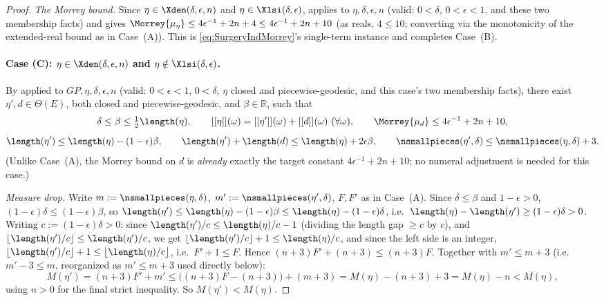 \begin{proof}
  \emph{The Morrey bound.} Since $\eta\in\Xden(\delta,\epsilon,n)$ and $\eta\in\Xlsi(\delta,
  \epsilon)$,  applies to $\eta,\delta,\epsilon,n$ (valid: $0<\delta$,
  $0<\epsilon<1$, and these two membership facts) and gives $\Morrey{\mu_\eta} \le
  4\epsilon^{-1}+2n+4 \le 4\epsilon^{-1}+2n+10$ (as reals, $4\le10$; converting via the monotonicity
  of the extended-real bound as in Case~(A)). This is \eqref{eq:SurgeryIndMorrey}'s single-term
  instance and completes Case~(B).

  \paragraph{Case (C): $\eta\in\Xden(\delta,\epsilon,n)$ and $\eta\notin\Xlsi(\delta,\epsilon)$.}
  By  applied to $GP,\eta,\delta,\epsilon,n$ (valid: $0<\epsilon<1$, $0<\delta$,
  $\eta$ closed and piecewise-geodesic, and this case's two membership facts), there exist
  $\eta',d\in\Theta(E)$, both closed and piecewise-geodesic, and $\beta\in\mathbb{R}$, such that
  \[
    \delta\le\beta\le\tfrac12\length(\eta),\qquad
    [[\eta]](\omega)=[[\eta']](\omega)+[[d]](\omega)\ (\forall\omega),\qquad
    \Morrey{\mu_d}\le4\epsilon^{-1}+2n+10,
  \]
  \[
    \length(\eta')\le\length(\eta)-(1-\epsilon)\beta,\qquad
    \length(\eta')+\length(d)\le\length(\eta)+2\epsilon\beta,\qquad
    \nsmallpieces(\eta',\delta)\le\nsmallpieces(\eta,\delta)+3
    .
  \]
  (Unlike Case~(A), the Morrey bound on $d$ is \emph{already} exactly the target constant
  $4\epsilon^{-1}+2n+10$; no numeral adjustment is needed for this case.)

  \emph{Measure drop.} Write $m:=\nsmallpieces(\eta,\delta)$,
  $m':=\nsmallpieces(\eta',\delta)$, $F,F'$ as in Case~(A). Since $\delta\le\beta$ and $1-\epsilon>0$,
  $(1-\epsilon)\delta\le(1-\epsilon)\beta$, so $\length(\eta')\le\length(\eta)-(1-\epsilon)\beta\le
  \length(\eta)-(1-\epsilon)\delta$, i.e.\ $\length(\eta)-\length(\eta')\ge(1-\epsilon)\delta>0$.
  Writing $c:=(1-\epsilon)\delta>0$: since $\length(\eta')/c \le \length(\eta)/c - 1$ (dividing the
  length gap $\ge c$ by $c$), and $\lfloor\length(\eta')/c\rfloor\le\length(\eta')/c$, we get
  $\lfloor\length(\eta')/c\rfloor+1 \le \length(\eta)/c$, and since the left side is an integer,
  $\lfloor\length(\eta')/c\rfloor+1 \le \lfloor\length(\eta)/c\rfloor$, i.e.\ $F'+1\le F$. Hence
  $(n+3)F'+(n+3) \le (n+3)F$. Together with $m'\le m+3$ (i.e.\ $m' - 3\le m$, reorganized as
  $m'\le m+3$ used directly below):
  \[
    M(\eta') = (n+3)F'+m' \le \bigl((n+3)F-(n+3)\bigr) + (m+3) = M(\eta) - (n+3)+3 = M(\eta) - n <
    M(\eta)
    ,
  \]
  using $n>0$ for the final strict inequality. So $M(\eta')<M(\eta)$.


\end{proof}

